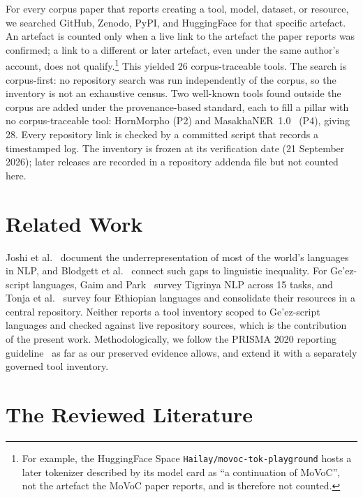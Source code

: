\documentclass[runningheads]{llncs}
\begin{document}
For every corpus paper that reports creating a tool, model, dataset, or resource, we searched GitHub, Zenodo, PyPI, and HuggingFace for that specific artefact. An artefact is counted only when a live link to the artefact the paper reports was confirmed; a link to a different or later artefact, even under the same author's account, does not qualify.\footnote{For example, the HuggingFace Space \texttt{Hailay/movoc-tok-playground} hosts a later tokenizer described by its model card as ``a continuation of MoVoC'', not the artefact the MoVoC paper reports, and is therefore not counted.} This yielded 26 corpus-traceable tools. The search is corpus-first: no repository search was run independently of the corpus, so the inventory is not an exhaustive census. Two well-known tools found outside the corpus are added under the provenance-based standard, each to fill a pillar with no corpus-traceable tool: HornMorpho (P2) and MasakhaNER~1.0~\cite{adelani_masakhaner_2021} (P4), giving 28. Every repository link is checked by a committed script that records a timestamped log. The inventory is frozen at its verification date (21 September 2026); later releases are recorded in a repository addenda file but not counted here.

\section{Related Work}\label{sec:related}

Joshi et al.~\cite{joshi_state_2020} document the underrepresentation of most of the world's languages in NLP, and Blodgett et al.~\cite{blodgett_language_2021} connect such gaps to linguistic inequality. For Ge'ez-script languages, Gaim and Park~\cite{gaim_tigrinya_2025} survey Tigrinya NLP across 15 tasks, and Tonja et al.~\cite{tonja_natural_2023} survey four Ethiopian languages and consolidate their resources in a central repository. Neither reports a tool inventory scoped to Ge'ez-script languages and checked against live repository sources, which is the contribution of the present work. Methodologically, we follow the PRISMA 2020 reporting guideline~\cite{page_prisma_2021} as far as our preserved evidence allows, and extend it with a separately governed tool inventory.

\section{The Reviewed Literature}\label{sec:literature}
\end{document}
